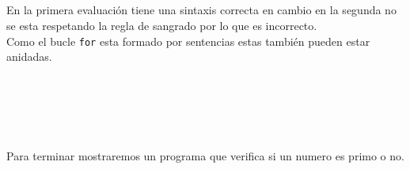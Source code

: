       \begin{fxcode}
         \\
         \\
         \\
         \\
         \\
         \\
         \\
         \\
         \\
      \end{fxcode}
      
      En la primera evaluación tiene una sintaxis correcta en cambio en la segunda no se esta respetando la regla de sangrado por lo que es incorrecto.
      \\
      
      Como el bucle \texttt{for} esta formado por sentencias estas también pueden estar anidadas.
      
      \begin{fxcode}
         \\
         \\
         \\
         \\
      \end{fxcode}
      
      Para terminar mostraremos un programa que verifica si un numero es primo o no.
      
